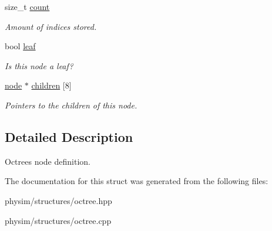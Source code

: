 \begin{DoxyCompactItemize}
\mbox{\label{structphysim_1_1structures_1_1octree_1_1node_ac8fab592afa663512b66c04a794d85a3}} 
size\+\_\+t \hyperlink{structphysim_1_1structures_1_1octree_1_1node_ac8fab592afa663512b66c04a794d85a3}{count}
\begin{DoxyCompactList}\small\item\em Amount of indices stored. \end{DoxyCompactList}\item 
\mbox{\label{structphysim_1_1structures_1_1octree_1_1node_a171e9edaf00329bb27e4014b13eb5445}} 
bool \hyperlink{structphysim_1_1structures_1_1octree_1_1node_a171e9edaf00329bb27e4014b13eb5445}{leaf}
\begin{DoxyCompactList}\small\item\em Is this node a leaf? \end{DoxyCompactList}\item 
\mbox{\label{structphysim_1_1structures_1_1octree_1_1node_ad2a9bf9588293e39212fc909fc4bcd58}} 
\hyperlink{structphysim_1_1structures_1_1octree_1_1node}{node} $\ast$ \hyperlink{structphysim_1_1structures_1_1octree_1_1node_ad2a9bf9588293e39212fc909fc4bcd58}{children} \mbox{[}8\mbox{]}
\begin{DoxyCompactList}\small\item\em Pointers to the children of this node. \end{DoxyCompactList}\end{DoxyCompactItemize}


\subsection{Detailed Description}
Octree\textquotesingle{}s node definition. 

The documentation for this struct was generated from the following files\+:\begin{DoxyCompactItemize}
\item 
physim/structures/octree.\+hpp\item 
physim/structures/octree.\+cpp\end{DoxyCompactItemize}

